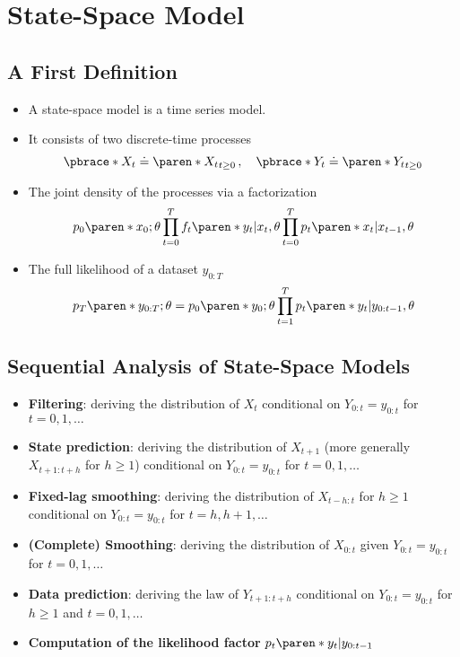 \section{State-Space Model}

\subsection{A First Definition}

\begin{itemize}
    \item A state-space model is a time series model.
    \item It consists of two discrete-time processes
    \begin{equation}
        \pbrace*{X_{t}} \doteq \paren*{X_{t}}_{t \geq 0}
        \,, \quad
        \pbrace*{Y_{t}} \doteq \paren*{Y_{t}}_{t \geq 0}
    \end{equation}
    \item The joint density of the processes via a factorization
    \begin{equation}
        p_{0} \paren*{x_{0}; \theta}
        \prod_{t = 0}^{T} f_{t} \paren*{ y_{t} \vert x_{t} , \theta}
        \prod_{t = 0}^{T} p_{t} \paren*{ x_{t} \vert x_{t-1} , \theta}
    \end{equation}
    \item The full likelihood of a dataset $y_{0:T}$
    \begin{equation}
        p_{T} \paren*{y_{0:T}; \theta} =
        p_{0} \paren*{ y_{0}; \theta}
        \prod_{t = 1}^{T} p_{t} \paren*{ y_{t} \vert y_{0:t-1} , \theta}
    \end{equation}
\end{itemize}

\subsection{Sequential Analysis of State-Space Models}

\begin{itemize}
    \item \textbf{Filtering}: deriving the distribution of $X_{t}$ conditional on $Y_{0:t} = y_{0:t}$ for $t = 0, 1, \ldots$
    \item \textbf{State prediction}: deriving the distribution of $X_{t+1}$ (more generally $X_{t+1:t+h}$ for $h \geq 1$) conditional on $Y_{0:t} = y_{0:t}$ for $t = 0, 1, \ldots$
    \item \textbf{Fixed-lag smoothing}: deriving the distribution of $X_{t - h:t}$ for $h \geq 1$ conditional on $Y_{0:t} = y_{0:t}$ for $t = h, h+1, \ldots$
    \item \textbf{(Complete) Smoothing}: deriving the distribution of $X_{0:t}$ given $Y_{0:t} = y_{0:t}$ for $t = 0, 1, \ldots$
    \item \textbf{Data prediction}: deriving the law of $Y_{t+1:t+h}$ conditional on $Y_{0:t} = y_{0:t}$ for $h \geq 1$ and $t = 0, 1, \ldots$
    \item \textbf{Computation of the likelihood factor} $p_{t} \paren*{y_{t} \vert y_{0:t-1}}$
\end{itemize}

